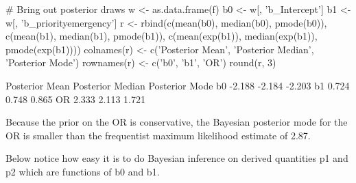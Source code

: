\begin{Schunk}
\begin{Sinput}
# Bring out posterior draws
w <- as.data.frame(f)
b0 <- w[, 'b_Intercept']
b1 <- w[, 'b_priorityemergency']
r  <- rbind(c(mean(b0), median(b0), pmode(b0)),
            c(mean(b1), median(b1), pmode(b1)),
            c(mean(exp(b1)), median(exp(b1)), pmode(exp(b1))))
colnames(r) <- c('Posterior Mean', 'Posterior Median', 'Posterior Mode')
rownames(r) <- c('b0', 'b1', 'OR')
round(r, 3)
\end{Sinput}
\begin{Soutput}
   Posterior Mean Posterior Median Posterior Mode
b0         -2.188           -2.184         -2.203
b1          0.724            0.748          0.865
OR          2.333            2.113          1.721
\end{Soutput}
\end{Schunk}

Because the prior on the OR is conservative, the Bayesian posterior mode for the OR is smaller than the frequentist maximum likelihood estimate of 2.87.  

Below notice how easy it is to do Bayesian inference on derived quantities p1 and p2 which are functions of b0 and b1.

